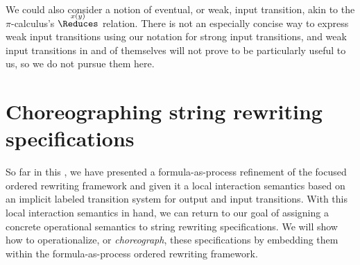 We could also consider a notion of eventual, or weak, input transition, akin to the $\pi$-calculus's $\overset{\smash{x(y)}}{\Reduces}$ relation.
There is not an especially concise way to express weak input transitions using our notation for strong input transitions, and weak input transitions in and of themselves will not prove to be particularly useful to us, so we do not pursue them here.


\clearpage
\section{Choreographing string rewriting specifications}\label{sec:formula-as-process:choreographies}

So far in this , we have presented a formula-as-process refinement of the focused ordered rewriting framework and given it a local interaction semantics based on an implicit labeled transition system for output and input transitions.
With this local interaction semantics in hand, we can return to our goal of assigning a concrete operational semantics to string rewriting specifications.
We will show how to operationalize, or \emph{choreograph}, these specifications by embedding them within the formula-as-process ordered rewriting framework.


